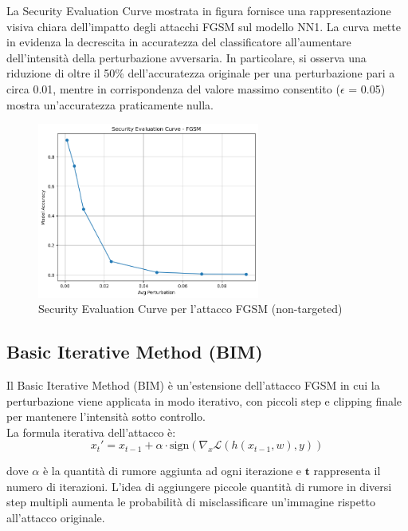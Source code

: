                 \noindent La Security Evaluation Curve mostrata in figura fornisce una rappresentazione visiva chiara dell’impatto degli attacchi FGSM sul modello NN1. La curva mette in evidenza la decrescita in accuratezza del classificatore all’aumentare dell’intensità della perturbazione avversaria.
                In particolare, si osserva una riduzione di oltre il 50\% dell’accuratezza originale per una perturbazione pari a circa 0.01, mentre in corrispondenza del valore massimo consentito ($\epsilon$ = 0.05) mostra un’accuratezza praticamente nulla.

                    \begin{figure}[H]
                        \centering
                        \includegraphics[width=0.65\textwidth]{images/evaluation_curve_fgsm.png}
                        \caption{Security Evaluation Curve per l'attacco FGSM (non-targeted)}
                    \end{figure}

        \subsection{Basic Iterative Method (BIM)}
            Il Basic Iterative Method (BIM) è un'estensione dell'attacco FGSM in cui la perturbazione viene applicata in modo iterativo, con piccoli step e clipping finale per mantenere l'intensità sotto controllo. \\
            La formula iterativa dell’attacco è:
                \[
                x_t' = x_{t-1} + \alpha \cdot \text{sign} \left( \nabla_x \mathcal{L}(h(x_{t-1}, w), y) \right)
                \]

            \noindent dove $\alpha$ è la quantità di rumore aggiunta ad ogni iterazione e $\boldsymbol{t}$  rappresenta il numero di iterazioni. L'idea di aggiungere piccole quantità di rumore in diversi step multipli aumenta le probabilità di misclassificare un'immagine rispetto all'attacco originale.

